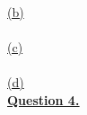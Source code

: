 \documentclass[12pt]{article}
\begin{document}
\noindent ~\\\hyperlink{toc}{\hypertarget{3.2}{(b)}}\\
\noindent ~\\\hyperlink{toc}{\hypertarget{3.3}{(c)}}\\
\noindent ~\\\hyperlink{toc}{\hypertarget{3.4}{(d)}}\\

\newpage
\noindent \hyperlink{toc}{\hypertarget{4}{\LARGE \underline{\textbf{Question 4.}}}}\\\\
\end{document}
